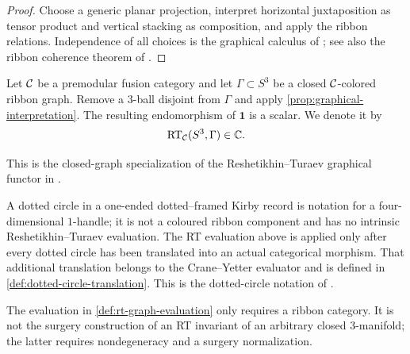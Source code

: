 \begin{proof}
Choose a generic planar projection, interpret horizontal juxtaposition as
tensor product and vertical stacking as composition, and apply the ribbon
relations.  Independence of all choices is the graphical calculus of
\cite[Chapter~2, especially Sections~2.2--2.3]{BakalovKirillov2001}; see also
the ribbon coherence theorem of \cite{Shum1994}.
\end{proof}

\begin{definition}
\label{def:rt-graph-evaluation}
Let \(\mathcal{C}\) be a premodular fusion category and let
$\Gamma\subset S^3$ be a closed $\mathcal{C}$-colored ribbon graph.  Remove a
$3$-ball disjoint from $\Gamma$ and apply
\cref{prop:graphical-interpretation}.  The resulting endomorphism of
$\mathbf 1$ is a scalar.  We denote it by
\[
  \operatorname{RT}_{\mathcal{C}}(S^3,\Gamma)\in\mathbb C.
\]
\end{definition}

\begin{remark}
\label{rem:rt-closed-graph-reference}
This is the closed-graph specialization of the Reshetikhin--Turaev graphical
functor in \cite[Chapter~2, Section~2.3]{BakalovKirillov2001}.
\end{remark}

\begin{remark}
\label{rem:dotted-circles-not-rt-colours}
A dotted circle in a one-ended dotted--framed Kirby record is notation for a
four-dimensional $1$-handle; it is not a coloured ribbon component and has
no intrinsic Reshetikhin--Turaev evaluation.  The RT evaluation above is
applied only after every dotted circle has been translated into an actual
categorical morphism.  That additional translation belongs to the
Crane--Yetter evaluator and is defined in
\cref{def:dotted-circle-translation}.  This is the dotted-circle notation of
\cite[Section~2.3.2 and Definition~2.49]{BarenzBarrett2018}.
\end{remark}

\begin{remark}
\label{rem:rt-graph-versus-manifold}
The evaluation in \cref{def:rt-graph-evaluation} only requires a ribbon
category.  It is not the surgery construction of an RT invariant of an
arbitrary closed $3$-manifold; the latter requires nondegeneracy and a
surgery normalization.
\end{remark}
